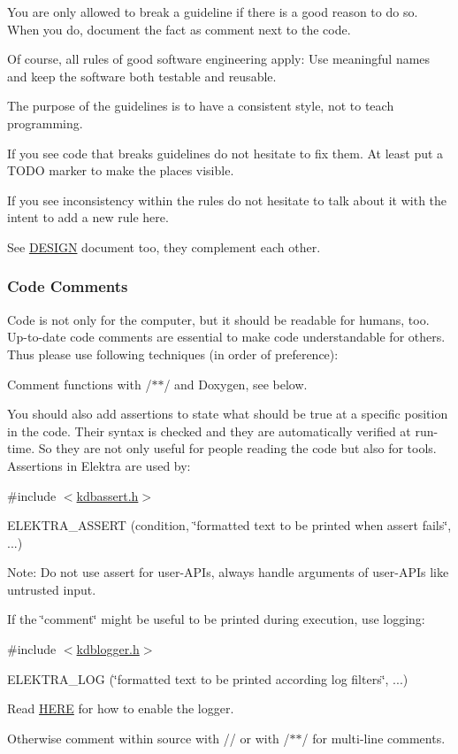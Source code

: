 You are only allowed to break a guideline if there is a good reason to do so. When you do, document the fact as comment next to the code.

Of course, all rules of good software engineering apply\+: Use meaningful names and keep the software both testable and reusable.

The purpose of the guidelines is to have a consistent style, not to teach programming.

If you see code that breaks guidelines do not hesitate to fix them. At least put a T\+O\+DO marker to make the places visible.

If you see inconsistency within the rules do not hesitate to talk about it with the intent to add a new rule here.

See \hyperlink{doc_DESIGN_md}{D\+E\+S\+I\+GN} document too, they complement each other.

\subsubsection*{Code Comments}

Code is not only for the computer, but it should be readable for humans, too. Up-\/to-\/date code comments are essential to make code understandable for others. Thus please use following techniques (in order of preference)\+:


\begin{DoxyEnumerate}
\item Comment functions with {\ttfamily /$\ast$$\ast$/} and Doxygen, see below.
\item You should also add assertions to state what should be true at a specific position in the code. Their syntax is checked and they are automatically verified at run-\/time. So they are not only useful for people reading the code but also for tools. Assertions in Elektra are used by\+:

{\ttfamily \#include $<$\hyperlink{kdbassert_8h}{kdbassert.\+h}$>$}

{\ttfamily E\+L\+E\+K\+T\+R\+A\+\_\+\+A\+S\+S\+E\+RT (condition, \char`\"{}formatted text to be printed when assert fails\char`\"{}, ...)}

Note\+: Do not use assert for user-\/\+A\+P\+Is, always handle arguments of user-\/\+A\+P\+Is like untrusted input.
\item If the \char`\"{}comment\char`\"{} might be useful to be printed during execution, use logging\+:

{\ttfamily \#include $<$\hyperlink{kdblogger_8h}{kdblogger.\+h}$>$}

{\ttfamily E\+L\+E\+K\+T\+R\+A\+\_\+\+L\+OG (\char`\"{}formatted text to be printed according log filters\char`\"{}, ...)}

Read \hyperlink{doc_dev_logging_md}{H\+E\+RE} for how to enable the logger.
\item Otherwise comment within source with {\ttfamily //} or with {\ttfamily /$\ast$$\ast$/} for multi-\/line comments.
\end{DoxyEnumerate}

